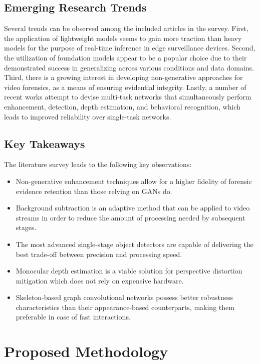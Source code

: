 \documentclass[conference]{IEEEtran}
\begin{document}
\subsection{Emerging Research Trends}

Several trends can be observed among the included articles in the survey. First, the application of lightweight models seems to gain more traction than heavy models for the purpose of real-time inference in edge surveillance devices. Second, the utilization of foundation models appear to be a popular choice due to their demonstrated success in generalizing across various conditions and data domains. Third, there is a growing interest in developing non-generative approaches for video forensics, as a means of ensuring evidential integrity. Lastly, a number of recent works attempt to devise multi-task networks that simultaneously perform enhancement, detection, depth estimation, and behavioral recognition, which leads to improved reliability over single-task networks.

\subsection{Key Takeaways}

The literature survey leads to the following key observations:

\begin{itemize}
    \item
Non-generative enhancement techniques allow for a higher fidelity of forensic evidence retention than those relying on GANs do.
\item
Background subtraction is an adaptive method that can be applied to video streams in order to reduce the amount of processing needed by subsequent stages.
\item
The most advanced single-stage object detectors are capable of delivering the best trade-off between precision and processing speed.
\item
Monocular depth estimation is a viable solution for perspective distortion mitigation which does not rely on expensive hardware.
\item
Skeleton-based graph convolutional networks possess better robustness characteristics than their appearance-based counterparts, making them preferable in case of fast interactions.
\end{itemize}

\section{Proposed Methodology}
\label{sec:methodology}
\end{document}
